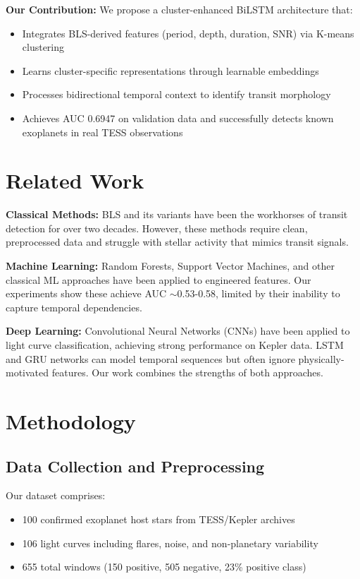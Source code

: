 \documentclass[twocolumn]{article}
\begin{document}
\textbf{Our Contribution:} We propose a cluster-enhanced BiLSTM architecture that:
\begin{itemize}
\item Integrates BLS-derived features (period, depth, duration, SNR) via K-means clustering
\item Learns cluster-specific representations through learnable embeddings
\item Processes bidirectional temporal context to identify transit morphology
\item Achieves AUC 0.6947 on validation data and successfully detects known exoplanets in real TESS observations
\end{itemize}

\section{Related Work}

\textbf{Classical Methods:} BLS and its variants have been the workhorses of transit detection for over two decades. However, these methods require clean, preprocessed data and struggle with stellar activity that mimics transit signals.

\textbf{Machine Learning:} Random Forests, Support Vector Machines, and other classical ML approaches have been applied to engineered features. Our experiments show these achieve AUC $\sim$0.53-0.58, limited by their inability to capture temporal dependencies.

\textbf{Deep Learning:} Convolutional Neural Networks (CNNs) have been applied to light curve classification, achieving strong performance on Kepler data. LSTM and GRU networks can model temporal sequences but often ignore physically-motivated features. Our work combines the strengths of both approaches.

\section{Methodology}

\subsection{Data Collection and Preprocessing}

Our dataset comprises:
\begin{itemize}
\item 100 confirmed exoplanet host stars from TESS/Kepler archives
\item 106 light curves including flares, noise, and non-planetary variability
\item 655 total windows (150 positive, 505 negative, 23\% positive class)
\end{itemize}
\end{document}
